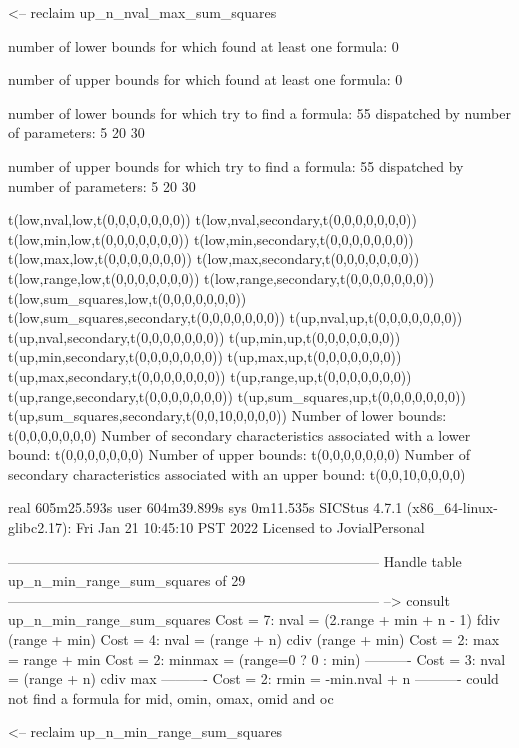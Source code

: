<-- reclaim up_n_nval_max_sum_squares

number of lower bounds for which found at least one formula: 0

number of upper bounds for which found at least one formula: 0

number of lower bounds for which try to find a formula: 55
dispatched by number of parameters: 5  20  30

number of upper bounds for which try to find a formula: 55
dispatched by number of parameters: 5  20  30

t(low,nval,low,t(0,0,0,0,0,0,0))
t(low,nval,secondary,t(0,0,0,0,0,0,0))
t(low,min,low,t(0,0,0,0,0,0,0))
t(low,min,secondary,t(0,0,0,0,0,0,0))
t(low,max,low,t(0,0,0,0,0,0,0))
t(low,max,secondary,t(0,0,0,0,0,0,0))
t(low,range,low,t(0,0,0,0,0,0,0))
t(low,range,secondary,t(0,0,0,0,0,0,0))
t(low,sum_squares,low,t(0,0,0,0,0,0,0))
t(low,sum_squares,secondary,t(0,0,0,0,0,0,0))
t(up,nval,up,t(0,0,0,0,0,0,0))
t(up,nval,secondary,t(0,0,0,0,0,0,0))
t(up,min,up,t(0,0,0,0,0,0,0))
t(up,min,secondary,t(0,0,0,0,0,0,0))
t(up,max,up,t(0,0,0,0,0,0,0))
t(up,max,secondary,t(0,0,0,0,0,0,0))
t(up,range,up,t(0,0,0,0,0,0,0))
t(up,range,secondary,t(0,0,0,0,0,0,0))
t(up,sum_squares,up,t(0,0,0,0,0,0,0))
t(up,sum_squares,secondary,t(0,0,10,0,0,0,0))
Number of lower bounds:                                             t(0,0,0,0,0,0,0)
Number of secondary characteristics associated with a lower bound:  t(0,0,0,0,0,0,0)
Number of upper bounds:                                             t(0,0,0,0,0,0,0)
Number of secondary characteristics associated with an upper bound: t(0,0,10,0,0,0,0)

real	605m25.593s
user	604m39.899s
sys	0m11.535s
SICStus 4.7.1 (x86_64-linux-glibc2.17): Fri Jan 21 10:45:10 PST 2022
Licensed to JovialPersonal


--------------------------------------------------------------------------------
Handle table up_n_min_range_sum_squares of 29
--------------------------------------------------------------------------------
--> consult up_n_min_range_sum_squares
Cost =  7:  nval   = (2.range + min + n - 1) fdiv (range + min)
Cost =  4:  nval   = (range + n) cdiv (range + min)
Cost =  2:  max    = range + min
Cost =  2:  minmax = (range=0 ? 0 : min)
----------
Cost =  3:  nval   = (range + n) cdiv max
----------
Cost =  2:  rmin   = -min.nval + n
----------
could not find a formula for mid, omin, omax, omid and oc

<-- reclaim up_n_min_range_sum_squares

